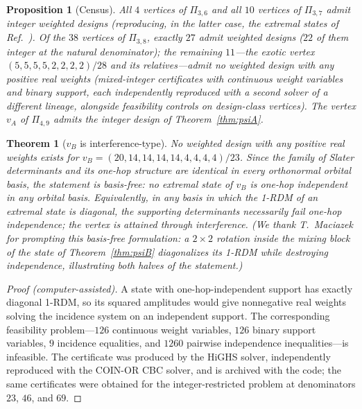 \documentclass[11pt]{article}
\newtheorem{theorem}{Theorem}
\newtheorem{proposition}{Proposition}
\begin{document}
\begin{proposition}[Census]
\label{prop:census}
All $4$ vertices of $\Pi_{3,6}$ and all $10$ vertices of $\Pi_{3,7}$ admit
integer weighted designs (reproducing, in the latter case, the extremal
states of Ref.~\cite{AK2008}). Of the $38$ vertices of $\Pi_{3,8}$, exactly
$27$ admit weighted designs ($22$ of them integer at the natural
denominator); the remaining $11$---the exotic vertex
$(5,5,5,5,2,2,2,2)/28$ and its relatives---admit no weighted design with
any positive real weights (mixed-integer certificates with continuous
weight variables and binary support, each independently reproduced with a
second solver of a different lineage, alongside feasibility controls on
design-class vertices). The vertex $v_A$ of $\Pi_{4,9}$
admits the integer design of Theorem~\ref{thm:psiA}.
\end{proposition}

\begin{theorem}[$v_B$ is interference-type]
\label{thm:B}
No weighted design with any positive real weights exists for
$v_B = (20,14,14,14,14,4,4,4,4)/23$. Since the family of Slater determinants
and its one-hop structure are identical in every orthonormal orbital basis,
the statement is basis-free: no extremal state of $v_B$ is one-hop independent in
\emph{any} orbital basis. Equivalently, in any basis in which the 1-RDM of an
extremal state is diagonal, the supporting determinants necessarily fail
one-hop independence; the vertex is attained through interference. (We thank
T.~Maciazek for prompting this basis-free formulation: a $2\times2$
rotation inside the mixing block of the state of Theorem~\ref{thm:psiB}
diagonalizes its 1-RDM while destroying independence, illustrating both halves
of the statement.)
\end{theorem}

\begin{proof}[Proof (computer-assisted)]
A state with one-hop-independent support has exactly diagonal 1-RDM, so
its squared amplitudes would give nonnegative real weights solving the
incidence system on an independent support. The corresponding feasibility
problem---$126$ continuous weight variables, $126$ binary support
variables, $9$ incidence equalities, and $1260$ pairwise independence
inequalities---is infeasible. The certificate was produced by the HiGHS
solver, independently reproduced with the COIN-OR CBC solver, and is
archived with the code; the same certificates were obtained for the
integer-restricted problem at denominators $23$, $46$, and $69$.
\end{proof}
\end{document}
